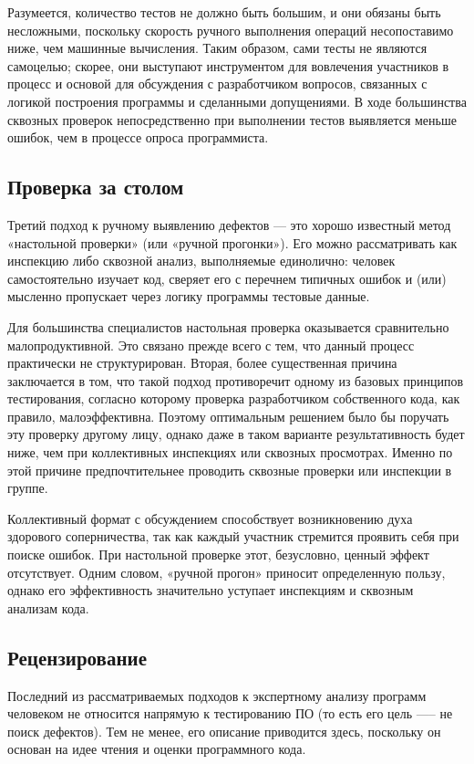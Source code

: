 \documentclass{article}[14pt]
\begin{document}
Разумеется, количество тестов не должно быть большим, и они обязаны быть несложными, поскольку скорость ручного выполнения 
операций несопоставимо ниже, чем машинные вычисления. Таким образом, сами тесты не являются самоцелью; скорее, они выступают 
инструментом для вовлечения участников в процесс и основой для обсуждения с разработчиком вопросов, связанных с логикой 
построения программы и сделанными допущениями. В ходе большинства сквозных проверок непосредственно при выполнении тестов 
выявляется меньше ошибок, чем в процессе опроса программиста.

\subsection{Проверка за столом}

Третий подход к ручному выявлению дефектов — это хорошо известный метод «настольной проверки» (или «ручной прогонки»). 
Его можно рассматривать как инспекцию либо сквозной анализ, выполняемые единолично: человек самостоятельно изучает код, 
сверяет его с перечнем типичных ошибок и (или) мысленно пропускает через логику программы тестовые данные.

Для большинства специалистов настольная проверка оказывается сравнительно малопродуктивной. Это связано прежде всего с тем, 
что данный процесс практически не структурирован. Вторая, более существенная причина заключается в том, что такой подход 
противоречит одному из базовых принципов тестирования, согласно которому проверка разработчиком собственного кода, 
как правило, малоэффективна. Поэтому оптимальным решением было бы поручать эту проверку другому лицу, 
однако даже в таком варианте результативность будет ниже, чем при коллективных инспекциях или сквозных просмотрах. 
Именно по этой причине предпочтительнее проводить сквозные проверки или инспекции в группе.

Коллективный формат с обсуждением способствует возникновению духа здорового соперничества, так как каждый участник стремится 
проявить себя при поиске ошибок. При настольной проверке этот, безусловно, ценный эффект отсутствует. Одним словом, 
«ручной прогон» приносит определенную пользу, однако его эффективность значительно уступает инспекциям и сквозным анализам 
кода.

\subsection{Рецензирование}

Последний из рассматриваемых подходов к экспертному анализу программ человеком не относится напрямую к тестированию ПО 
(то есть его цель —-- не поиск дефектов). Тем не менее, его описание приводится здесь, поскольку он основан на идее чтения и 
оценки программного кода.
\end{document}
